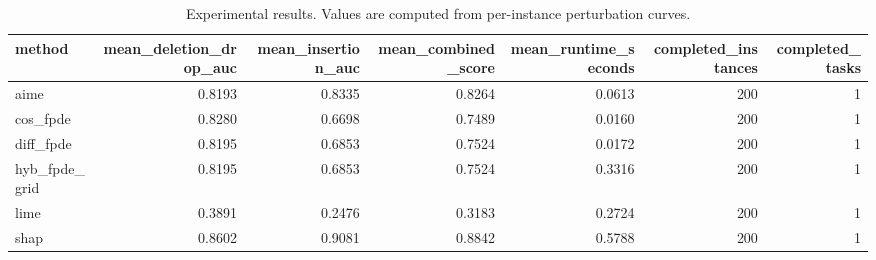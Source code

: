 \begin{table}[t]
\caption{Experimental results. Values are computed from per-instance perturbation curves.}
\label{tab:main_results_computed}
\centering
\begin{tabular}{lrrrrrr}
\toprule
method & mean\_deletion\_drop\_auc & mean\_insertion\_auc & mean\_combined\_score & mean\_runtime\_seconds & completed\_instances & completed\_tasks \\
\midrule
aime & 0.8193 & 0.8335 & 0.8264 & 0.0613 & 200 & 1 \\
cos\_fpde & 0.8280 & 0.6698 & 0.7489 & 0.0160 & 200 & 1 \\
diff\_fpde & 0.8195 & 0.6853 & 0.7524 & 0.0172 & 200 & 1 \\
hyb\_fpde\_grid & 0.8195 & 0.6853 & 0.7524 & 0.3316 & 200 & 1 \\
lime & 0.3891 & 0.2476 & 0.3183 & 0.2724 & 200 & 1 \\
shap & 0.8602 & 0.9081 & 0.8842 & 0.5788 & 200 & 1 \\
\bottomrule
\end{tabular}

\end{table}
